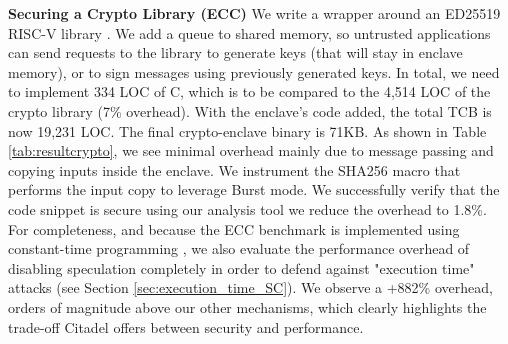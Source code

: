 \noindent\textbf{Securing a Crypto Library (ECC)}
\label{sec:evalcrypto}
We write a wrapper around an ED25519 RISC-V library \cite{ed25519github}.
We add a queue to shared memory, so untrusted applications can send requests to the library to generate keys (that will stay in enclave memory), or to sign messages using previously generated keys.
In total, we need to implement 334 LOC of C, which is to be compared to the 4,514 LOC of the crypto library (7\% overhead).
With the enclave's code added, the total TCB is now 19,231 LOC.
The final crypto-enclave binary is 71KB.
As shown in Table \ref{tab:resultcrypto}, we see minimal overhead mainly due to message passing and copying inputs inside the enclave.
We instrument the SHA256 macro that performs the input copy to leverage Burst mode.
We successfully verify that the code snippet is secure using our analysis tool we reduce the overhead to 1.8\%.
For completeness, and because the ECC benchmark is implemented using constant-time programming \cite{reparaz2017dude, almeida2016verifying}, we also evaluate the performance overhead of disabling speculation completely in order to defend against "execution time" attacks (see Section \ref{sec:execution_time_SC}). We observe a +882\% overhead, orders of magnitude above our other mechanisms, which clearly highlights the trade-off Citadel offers between security and performance.
\\

